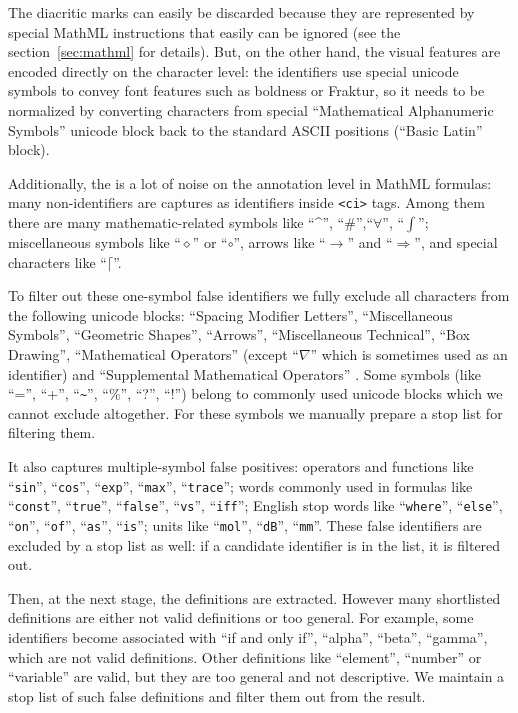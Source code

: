 The diacritic marks can easily be discarded because they are represented 
by special MathML instructions that easily can be ignored 
(see the section~\ref{sec:mathml} for details). But, on the other hand,
the visual features are encoded directly on the character level: 
the identifiers use special unicode symbols to convey font features such 
as boldness or Fraktur, so it needs to be normalized by converting characters
from special ``Mathematical Alphanumeric Symbols'' unicode block \cite{allen2007unicode}
back to the standard ASCII positions (``Basic Latin'' block).

Additionally, the is a lot of noise on the annotation level in MathML formulas: 
many non-identifiers are captures as identifiers inside \verb|<ci>| tags. Among 
them there are many mathematic-related symbols
like ``\textasciicircum'', ``\#'',``$\forall$'', ``$\int$''; 
miscellaneous symbols like ``$\diamond$'' or
``$\circ$'', arrows like ``$\to$'' and ``$\Rightarrow$'', and special characters like
``$\lceil$''.

To filter out these one-symbol false identifiers we fully exclude all characters from 
the following unicode blocks: ``Spacing Modifier Letters'', ``Miscellaneous Symbols'', 
``Geometric Shapes'', ``Arrows'', ``Miscellaneous Technical'', ``Box Drawing'', 
``Mathematical Operators'' (except ``$\nabla$'' which is sometimes used as an identifier)
and ``Supplemental Mathematical Operators'' \cite{allen2007unicode}.
Some symbols (like ``='', ``+'', ``\verb|~|'', ``\%'', ``?'', ``!'')
belong to commonly used unicode blocks which we cannot exclude altogether. 
For these symbols we manually prepare a stop list for filtering them.

It also captures multiple-symbol false positives: operators and functions
like ``\texttt{sin}'', ``\texttt{cos}'', ``\texttt{exp}'', ``\texttt{max}'', ``\texttt{trace}''; 
words commonly used in formulas like ``\texttt{const}'', ``\texttt{true}'', ``\texttt{false}'',
``\texttt{vs}'', ``\texttt{iff}''; English stop words like ``\texttt{where}'', ``\texttt{else}'',
``\texttt{on}'', ``\texttt{of}'', ``\texttt{as}'', ``\texttt{is}''; 
units like ``\texttt{mol}'', ``\texttt{dB}'', ``\texttt{mm}''.
These false identifiers are excluded by a stop list as well: if a
candidate identifier is in the list, it is filtered out.


Then, at the next stage, the definitions are extracted. However many 
shortlisted definitions are either not valid definitions or too general. 
For example, some identifiers become associated with ``if and only if'', 
``alpha'', ``beta'', ``gamma'', which are not valid definitions. Other definitions
like ``element'', ``number'' or ``variable'' are valid, but 
they are too general and not descriptive. We maintain a stop list of such 
false definitions and filter them out from the result. 



